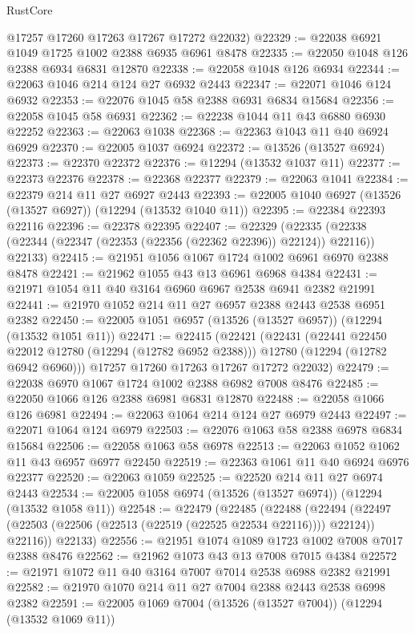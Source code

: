 \begin{lexlean}{RustCore}
\begin{coremodule}
      @17257
      @17260
      @17263
      @17267
      @17272
      @22032)
@22329 := @22038 @6921 @1049 @1725 @1002 @2388 @6935 @6961 @8478
@22335 := @22050 @1048 @126 @2388 @6934 @6831 @12870
@22338 := @22058 @1048 @126 @6934
@22344 := @22063 @1046 @214 @124 @27 @6932 @2443
@22347 := @22071 @1046 @124 @6932
@22353 := @22076 @1045 @58 @2388 @6931 @6834 @15684
@22356 := @22058 @1045 @58 @6931
@22362 := @22238 @1044 @11 @43 @6880 @6930 @22252
@22363 := @22063 @1038
@22368 := @22363 @1043 @11 @40 @6924 @6929
@22370 := @22005 @1037 @6924
@22372 := @13526 (@13527 @6924)
@22373 := @22370 @22372
@22376 := @12294 (@13532 @1037 @11)
@22377 := @22373 @22376
@22378 := @22368 @22377
@22379 := @22063 @1041
@22384 := @22379 @214 @11 @27 @6927 @2443
@22393 := @22005 @1040 @6927 (@13526 (@13527 @6927)) (@12294 (@13532 @1040 @11))
@22395 := @22384 @22393 @22116
@22396 := @22378 @22395
@22407 := @22329
    (@22335 (@22338 (@22344 (@22347 (@22353 (@22356 (@22362 @22396)) @22124)) @22116)) @22133)
@22415 := @21951 @1056 @1067 @1724 @1002 @6961 @6970 @2388 @8478
@22421 := @21962 @1055 @43 @13 @6961 @6968 @4384
@22431 := @21971 @1054 @11 @40 @3164 @6960 @6967 @2538 @6941 @2382 @21991
@22441 := @21970 @1052 @214 @11 @27 @6957 @2388 @2443 @2538 @6951 @2382
@22450 := @22005 @1051 @6957 (@13526 (@13527 @6957)) (@12294 (@13532 @1051 @11))
@22471 := @22415
    (@22421
      (@22431
        (@22441 @22450 @22012 @12780 (@12294 (@12782 @6952 @2388)))
        @12780
        (@12294 (@12782 @6942 @6960)))
      @17257
      @17260
      @17263
      @17267
      @17272
      @22032)
@22479 := @22038 @6970 @1067 @1724 @1002 @2388 @6982 @7008 @8476
@22485 := @22050 @1066 @126 @2388 @6981 @6831 @12870
@22488 := @22058 @1066 @126 @6981
@22494 := @22063 @1064 @214 @124 @27 @6979 @2443
@22497 := @22071 @1064 @124 @6979
@22503 := @22076 @1063 @58 @2388 @6978 @6834 @15684
@22506 := @22058 @1063 @58 @6978
@22513 := @22063 @1052 @1062 @11 @43 @6957 @6977 @22450
@22519 := @22363 @1061 @11 @40 @6924 @6976 @22377
@22520 := @22063 @1059
@22525 := @22520 @214 @11 @27 @6974 @2443
@22534 := @22005 @1058 @6974 (@13526 (@13527 @6974)) (@12294 (@13532 @1058 @11))
@22548 := @22479
    (@22485
      (@22488
        (@22494 (@22497 (@22503 (@22506 (@22513 (@22519 (@22525 @22534 @22116)))) @22124)) @22116))
      @22133)
@22556 := @21951 @1074 @1089 @1723 @1002 @7008 @7017 @2388 @8476
@22562 := @21962 @1073 @43 @13 @7008 @7015 @4384
@22572 := @21971 @1072 @11 @40 @3164 @7007 @7014 @2538 @6988 @2382 @21991
@22582 := @21970 @1070 @214 @11 @27 @7004 @2388 @2443 @2538 @6998 @2382
@22591 := @22005 @1069 @7004 (@13526 (@13527 @7004)) (@12294 (@13532 @1069 @11))

\end{coremodule}
\end{lexlean}
